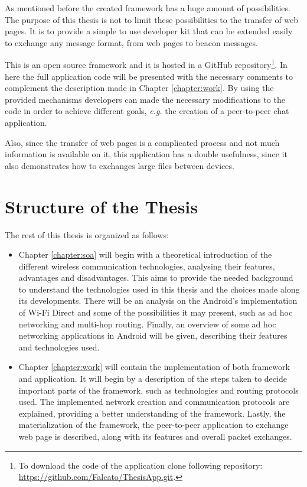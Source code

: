 As mentioned before the created framework has a huge amount of possibilities. The purpose of this thesis is not to limit these possibilities to the transfer of web pages. It is to provide a simple to use developer kit that can be extended easily to exchange any message format, from web pages to beacon messages.

This is an open source framework and it is hosted in a GitHub repository\footnote{To download the code of the application clone following repository: \url{https://github.com/Falcato/ThesisApp.git}.}. In here the full application code will be presented with the necessary comments to complement the description made in Chapter \ref{chapter:work}. By using the provided mechanisms developers can made the necessary modifications to the code in order to achieve different goals, \textit{e.g.} the creation of a peer-to-peer chat application.

Also, since the transfer of web pages is a complicated process and not much information is available on it, this application has a double usefulness, since it also demonstrates how to exchanges large files between devices.

\section{Structure of the Thesis}

The rest of this thesis is organized as follows:

\begin{itemize}
	\item Chapter \ref{chapter:soa} will begin with a theoretical introduction of the different wireless communication technologies, analysing their features, advantages and disadvantages. This aims to provide the needed background to understand the technologies used in this thesis and the choices made along its developments. There will be an analysis on the Android's implementation of Wi-Fi Direct and some of the possibilities it may present, such as ad hoc networking and multi-hop routing. Finally, an overview of some ad hoc networking applications in Android will be given, describing their features and technologies used.
	
	\item Chapter \ref{chapter:work} will contain the implementation of both framework and application. It will begin by a description of the steps taken to decide important parts of the framework, such as technologies and routing protocols used. The implemented network creation and communication protocols are explained, providing a better understanding of the framework. Lastly, the materialization of the framework, the peer-to-peer application to exchange web page is described, along with its features and overall packet exchanges.
	
	
\end{itemize}









